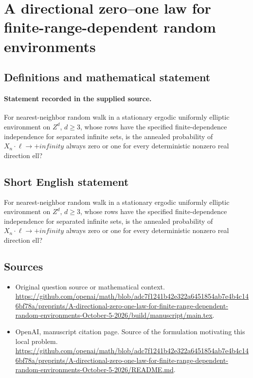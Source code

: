 \documentclass[11pt]{article}
\begin{document}
\section*{A directional zero–one law for finite-range-dependent random environments}\label{statement}
\subsection{Definitions and mathematical statement}
\paragraph{Statement recorded in the supplied source.}
For nearest-neighbor random walk in a stationary ergodic uniformly elliptic environment on $Z^d$, $d\geq 3$, whose rows have the specified finite-dependence independence for separated infinite sets, is the annealed probability of $X_n\cdot \ell \to +infinity$ always zero or one for every deterministic nonzero real direction ell?
\subsection{Short English statement}
For nearest-neighbor random walk in a stationary ergodic uniformly elliptic environment on $Z^d$, $d\geq 3$, whose rows have the specified finite-dependence independence for separated infinite sets, is the annealed probability of $X_n\cdot \ell \to +infinity$ always zero or one for every deterministic nonzero real direction ell?
\subsection{Sources}
\begin{itemize}
\item[S1] Original question source or mathematical context.
\url{https://github.com/openai/math/blob/adc7f1241b42e322a6451854ab7e4b4c146bf78a/preprints/A-directional-zero-one-law-for-finite-range-dependent-random-environments-October-5-2026/build/manuscript/main.tex}.
\item[S2] OpenAI, manuscript citation page. Source of the formulation motivating this local problem.
\url{https://github.com/openai/math/blob/adc7f1241b42e322a6451854ab7e4b4c146bf78a/preprints/A-directional-zero-one-law-for-finite-range-dependent-random-environments-October-5-2026/README.md}.
\end{itemize}
\end{document}
